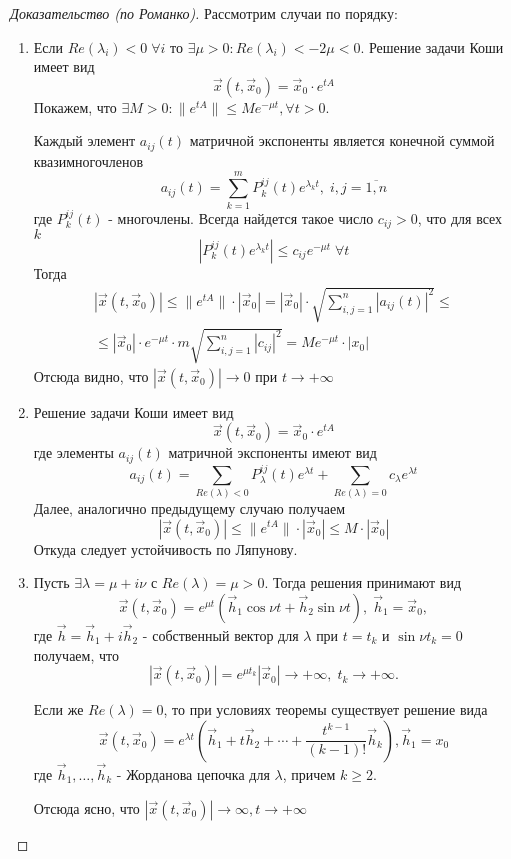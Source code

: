 \begin{proof}[Доказательство (по Романко)]
	Рассмотрим случаи по порядку:
	\begin{enumerate}
		\item Если $Re(\lambda_i)<0 \; \forall i$ то $\exists \mu >0 : Re(\lambda_i)< -2\mu < 0$. Решение задачи Коши имеет вид 
		\[
			\vec{x}(t, \vec{x}_0) = \vec{x}_0\cdot e^{tA}
		\]
		Покажем, что $\exists M>0: \|e^{tA}\| \leqslant Me^{-\mu t}, \forall t>0$.
		
		Каждый элемент $a_{ij}(t)$ матричной экспоненты является конечной суммой квазимногочленов
		\[
			a_{ij}(t) = \sum_{k=1}^m P_k^{ij}(t)e^{\lambda_kt},\;  i,j=\overline{1,n}
		\]
		где $P_k^{ij}(t)$ - многочлены. Всегда найдется такое число $c_{ij}>0$, что для всех $k$
		\[
			|P_k^{ij}(t)e^{\lambda_kt}|\leqslant c_{ij}e^{-\mu t} \; \forall t
		\]
		Тогда
		\begin{multline*}
		|\vec{x}(t, \vec{x}_0)|\leqslant \|e^{tA}\|\cdot|\vec{x}_0| = |\vec{x}_0|\cdot\sqrt{\sum_{i,j=1}^n|a_{ij}(t)|^2}\leqslant\\\leqslant|\vec{x}_0|\cdot e^{-\mu t}\cdot m \sqrt{\sum_{i,j=1}^n|c_{ij}|^2} = Me^{-\mu t}\cdot |x_0|
		\end{multline*}
		Отсюда видно, что $|\vec{x}(t, \vec{x}_0)| \to 0$ при $t \to +\infty$
	\item 
		Решение задачи Коши имеет вид 
		\[
		\vec{x}(t, \vec{x}_0) = \vec{x}_0\cdot e^{tA}
		\]
		где элементы $a_{ij}(t)$ матричной экспоненты имеют вид
		\[
			a_{ij}(t) = \sum_{Re(\lambda) < 0}P_\lambda^{ij}(t)e^{\lambda t} + \sum_{Re(\lambda)=0}c_\lambda e^{\lambda t}
		\]
		Далее, аналогично предыдущему случаю получаем
		\[
			|\vec{x}(t, \vec{x}_0)| \leqslant \|e^{tA}\|\cdot|\vec{x}_0| \leqslant M\cdot|\vec{x}_0| 
		\]
		Откуда следует устойчивость по Ляпунову.
	\item
		Пусть $\exists \lambda = \mu + i \nu$ с $Re(\lambda) = \mu >0$. Тогда решения принимают вид
		\[
			\vec{x}(t, \vec{x}_0) = e^{\mu t}(\vec{h}_1\cos{\nu t}+ \vec{h}_2\sin{\nu t}), \; \vec{h}_1 = \vec{x}_0,
		\]
		где $\vec{h} = \vec{h}_1 + i\vec{h}_2$ - собственный вектор для $\lambda$ при $t = t_k$ и $\sin{\nu t_k} = 0$ получаем, что
		\[
			|\vec{x}(t, \vec{x}_0)| = e^{\mu t_k}|\vec{x}_0| \to +\infty,\; t_k\to+\infty.
		\]
		
		Если же $Re(\lambda) = 0$, то при условиях теоремы существует решение вида
		\[
			\vec{x}(t, \vec{x}_0) = e^{\lambda t}\left( \vec{h}_1 + t\vec{h}_2 + \cdots + \frac{t^{k-1}}{(k-1)!}\vec{h}_k\right), \vec{h}_1=x_0
		\]
		где $\vec{h}_1, \dots,\vec{h}_k$ - Жорданова цепочка для $\lambda$, причем $k \geqslant 2$. 
		
		Отсюда ясно, что $|\vec{x}(t, \vec{x}_0)| \to \infty, t\to +\infty$
		
	\end{enumerate}
\end{proof}
